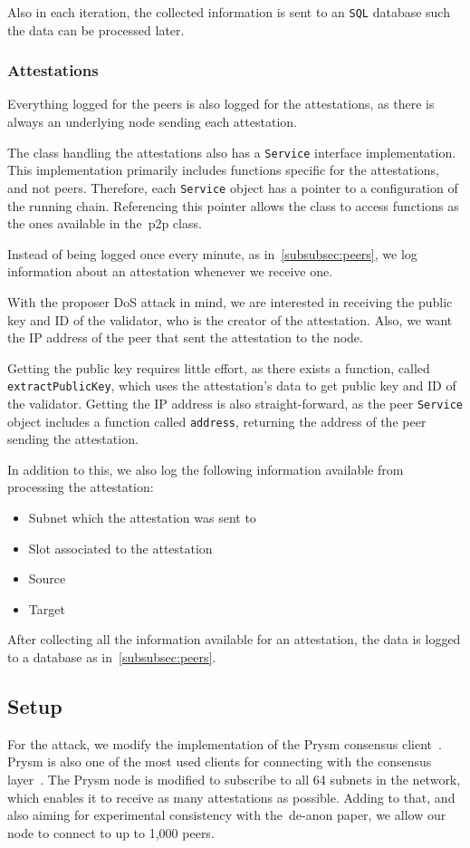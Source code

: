 Also in each iteration,
the collected information is sent to an \texttt{SQL} database such the data can be processed later.

\subsubsection{Attestations}\label{subsubsec:attestations}
Everything logged for the peers is also logged for the attestations,
as there is always an underlying node sending each attestation.

The class handling the attestations also has a \texttt{Service} interface implementation.
This implementation primarily includes functions specific for the attestations, and not peers.
Therefore, each \texttt{Service} object has a pointer to a configuration of the running chain.
Referencing this pointer allows the class to access functions as the ones available in the~\gls{p2p} class.

Instead of being logged once every minute, as in~\autoref{subsubsec:peers},
we log information about an attestation whenever we receive one.

With the proposer DoS attack in mind, we are interested in receiving the public key and ID of the validator,
who is the creator of the attestation.
Also, we want the IP address of the peer that sent the attestation to the node.

Getting the public key requires little effort,
as there exists a function, called \texttt{extractPublicKey}, which uses the attestation's data to get public key and ID of the validator.
Getting the IP address is also straight-forward, as the peer \texttt{Service} object includes a function called \texttt{address}, returning the address of the peer sending the attestation.

In addition to this, we also log the following information available from processing the attestation:
\begin{itemize}
     \item Subnet which the attestation was sent to
     \item Slot associated to the attestation
     \item Source
     \item Target
\end{itemize}

After collecting all the information available for an attestation,
the data is logged to a database as in~\autoref{subsubsec:peers}.

\subsection{Setup}\label{subsec:setup}
For the attack, we modify the implementation of the Prysm consensus client~\cite{prysm}.
Prysm is also one of the most used clients for connecting with the consensus layer~\cite{client-diversity}.
The Prysm node is modified to subscribe to all 64 subnets in the network, which enables it to receive as many attestations as possible.
Adding to that, and also aiming for experimental consistency with the~\gls{de-anon paper}, we allow our node to connect to up to 1,000 peers.


